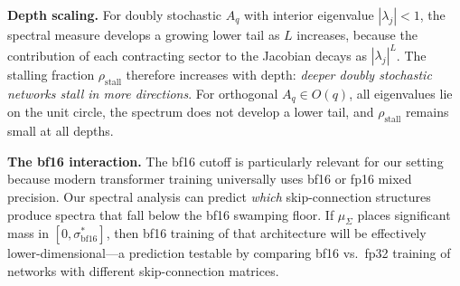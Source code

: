 \noindent\textbf{Depth scaling.}
For doubly stochastic $A_q$ with interior eigenvalue $|\lambda_j| < 1$, the spectral measure develops a growing lower tail as $L$ increases, because the contribution of each contracting sector to the Jacobian decays as $|\lambda_j|^L$. The stalling fraction $\rho_{\mathrm{stall}}$ therefore increases with depth: \emph{deeper doubly stochastic networks stall in more directions}. For orthogonal $A_q \in O(q)$, all eigenvalues lie on the unit circle, the spectrum does not develop a lower tail, and $\rho_{\mathrm{stall}}$ remains small at all depths.

\medskip
\noindent\textbf{The bf16 interaction.}
The bf16 cutoff is particularly relevant for our setting because modern transformer training universally uses bf16 or fp16 mixed precision. Our spectral analysis can predict \emph{which} skip-connection structures produce spectra that fall below the bf16 swamping floor. If $\mu_\Sigma$ places significant mass in $[0, \sigma^*_{\mathrm{bf16}}]$, then bf16 training of that architecture will be effectively lower-dimensional---a prediction testable by comparing bf16 vs.\ fp32 training of networks with different skip-connection matrices.
